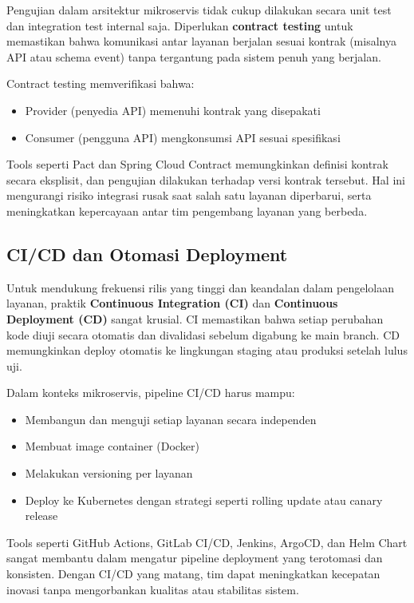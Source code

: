 Pengujian dalam arsitektur mikroservis tidak cukup dilakukan secara unit test dan integration test internal saja. Diperlukan \textbf{contract testing} untuk memastikan bahwa komunikasi antar layanan berjalan sesuai kontrak (misalnya API atau schema event) tanpa tergantung pada sistem penuh yang berjalan.

Contract testing memverifikasi bahwa:
\begin{itemize}
	\item Provider (penyedia API) memenuhi kontrak yang disepakati
	\item Consumer (pengguna API) mengkonsumsi API sesuai spesifikasi
\end{itemize}

Tools seperti Pact dan Spring Cloud Contract memungkinkan definisi kontrak secara eksplisit, dan pengujian dilakukan terhadap versi kontrak tersebut. Hal ini mengurangi risiko integrasi rusak saat salah satu layanan diperbarui, serta meningkatkan kepercayaan antar tim pengembang layanan yang berbeda.

\subsection{CI/CD dan Otomasi Deployment}

Untuk mendukung frekuensi rilis yang tinggi dan keandalan dalam pengelolaan layanan, praktik \textbf{Continuous Integration (CI)} dan \textbf{Continuous Deployment (CD)} sangat krusial. CI memastikan bahwa setiap perubahan kode diuji secara otomatis dan divalidasi sebelum digabung ke main branch. CD memungkinkan deploy otomatis ke lingkungan staging atau produksi setelah lulus uji.

Dalam konteks mikroservis, pipeline CI/CD harus mampu:
\begin{itemize}
	\item Membangun dan menguji setiap layanan secara independen
	\item Membuat image container (Docker)
	\item Melakukan versioning per layanan
	\item Deploy ke Kubernetes dengan strategi seperti rolling update atau canary release
\end{itemize}

Tools seperti GitHub Actions, GitLab CI/CD, Jenkins, ArgoCD, dan Helm Chart sangat membantu dalam mengatur pipeline deployment yang terotomasi dan konsisten. Dengan CI/CD yang matang, tim dapat meningkatkan kecepatan inovasi tanpa mengorbankan kualitas atau stabilitas sistem.


